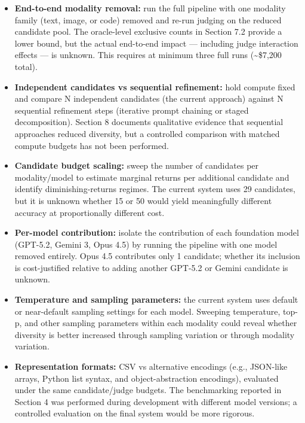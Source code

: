 \documentclass[11pt]{article}
\providecommand{\tightlist}{%
  \setlength{\itemsep}{0pt}\setlength{\parskip}{0pt}}
\begin{document}
\begin{itemize}
\tightlist
\item
  \textbf{End-to-end modality removal:} run the full pipeline with one
  modality family (text, image, or code) removed and re-run judging on
  the reduced candidate pool. The oracle-level exclusive counts in
  Section 7.2 provide a lower bound, but the actual end-to-end impact
  --- including judge interaction effects --- is unknown. This requires
  at minimum three full runs (\textasciitilde\$7,200 total).
\item
  \textbf{Independent candidates vs sequential refinement:} hold compute
  fixed and compare N independent candidates (the current approach)
  against N sequential refinement steps (iterative prompt chaining or
  staged decomposition). Section 8 documents qualitative evidence that
  sequential approaches reduced diversity, but a controlled comparison
  with matched compute budgets has not been performed.
\item
  \textbf{Candidate budget scaling:} sweep the number of candidates per
  modality/model to estimate marginal returns per additional candidate
  and identify diminishing-returns regimes. The current system uses 29
  candidates, but it is unknown whether 15 or 50 would yield
  meaningfully different accuracy at proportionally different cost.
\item
  \textbf{Per-model contribution:} isolate the contribution of each
  foundation model (GPT-5.2, Gemini 3, Opus 4.5) by running the pipeline
  with one model removed entirely. Opus 4.5 contributes only 1
  candidate; whether its inclusion is cost-justified relative to adding
  another GPT-5.2 or Gemini candidate is unknown.
\item
  \textbf{Temperature and sampling parameters:} the current system uses
  default or near-default sampling settings for each model. Sweeping
  temperature, top-p, and other sampling parameters within each modality
  could reveal whether diversity is better increased through sampling
  variation or through modality variation.
\item
  \textbf{Representation formats:} CSV vs alternative encodings (e.g.,
  JSON-like arrays, Python list syntax, and object-abstraction
  encodings), evaluated under the same candidate/judge budgets. The
  benchmarking reported in Section 4 was performed during development
  with different model versions; a controlled evaluation on the final
  system would be more rigorous.
\end{itemize}
\end{document}
